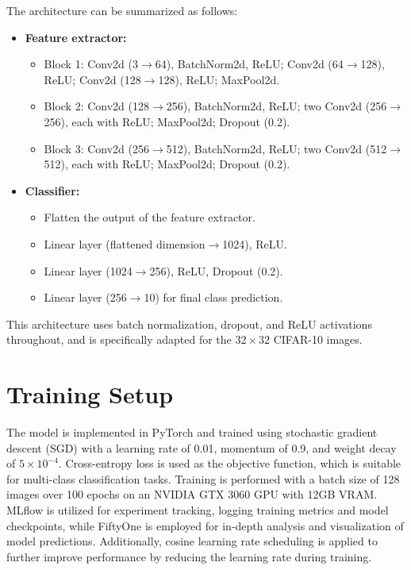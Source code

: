 \documentclass[12pt,a4paper]{article}
\begin{document}
The architecture can be summarized as follows:
\begin{itemize}
    \item \textbf{Feature extractor:}
        \begin{itemize}
            \item Block 1: Conv2d (3$\rightarrow$64), BatchNorm2d, ReLU; Conv2d (64$\rightarrow$128), ReLU; Conv2d (128$\rightarrow$128), ReLU; MaxPool2d.
            \item Block 2: Conv2d (128$\rightarrow$256), BatchNorm2d, ReLU; two Conv2d (256$\rightarrow$256), each with ReLU; MaxPool2d; Dropout (0.2).
            \item Block 3: Conv2d (256$\rightarrow$512), BatchNorm2d, ReLU; two Conv2d (512$\rightarrow$512), each with ReLU; MaxPool2d; Dropout (0.2).
    \end{itemize}
    \item \textbf{Classifier:}
    \begin{itemize}
        \item Flatten the output of the feature extractor.
        \item Linear layer (flattened dimension$\rightarrow$1024), ReLU.
        \item Linear layer (1024$\rightarrow$256), ReLU, Dropout (0.2).
        \item Linear layer (256$\rightarrow$10) for final class prediction.
    \end{itemize}
\end{itemize}
This architecture uses batch normalization, dropout, and ReLU activations throughout, and is specifically adapted for the $32\times32$ CIFAR-10 images.

\section{Training Setup}
The model is implemented in PyTorch and trained using stochastic gradient descent (SGD) with a learning rate of 0.01, momentum of 0.9, and weight decay of $5 \times 10^{-4}$. Cross-entropy loss is used as the objective function, which is suitable for multi-class classification tasks. Training is performed with a batch size of 128 images over 100 epochs on an NVIDIA GTX 3060 GPU with 12GB VRAM. MLflow is utilized for experiment tracking, logging training metrics and model checkpoints, while FiftyOne is employed for in-depth analysis and visualization of model predictions. Additionally, cosine learning rate scheduling is applied to further improve performance by reducing the learning rate during training.
\end{document}
